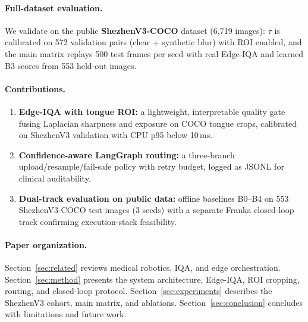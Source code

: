 \paragraph{Full-dataset evaluation.}
We validate on the public \textbf{ShezhenV3-COCO} dataset (6{,}719 images): $\tau$ is calibrated on 572 validation pairs (clear + synthetic blur) with ROI enabled, and the main matrix replays 500 test frames per seed with real Edge-IQA and learned B3 scores from 553 held-out images.

\paragraph{Contributions.}
\begin{enumerate}
  \item \textbf{Edge-IQA with tongue ROI:} a lightweight, interpretable quality gate fusing Laplacian sharpness and exposure on COCO tongue crops, calibrated on ShezhenV3 validation with CPU p95 below 10\,ms.
  \item \textbf{Confidence-aware LangGraph routing:} a three-branch upload/resample/fail-safe policy with retry budget, logged as JSONL for clinical auditability.
  \item \textbf{Dual-track evaluation on public data:} offline baselines B0--B4 on 553 ShezhenV3-COCO test images (3 seeds) with a separate Franka closed-loop track confirming execution-stack feasibility.
\end{enumerate}

\paragraph{Paper organization.}
Section~\ref{sec:related} reviews medical robotics, IQA, and edge orchestration.
Section~\ref{sec:method} presents the system architecture, Edge-IQA, ROI cropping, routing, and closed-loop protocol.
Section~\ref{sec:experiments} describes the ShezhenV3 cohort, main matrix, and ablations.
Section~\ref{sec:conclusion} concludes with limitations and future work.

